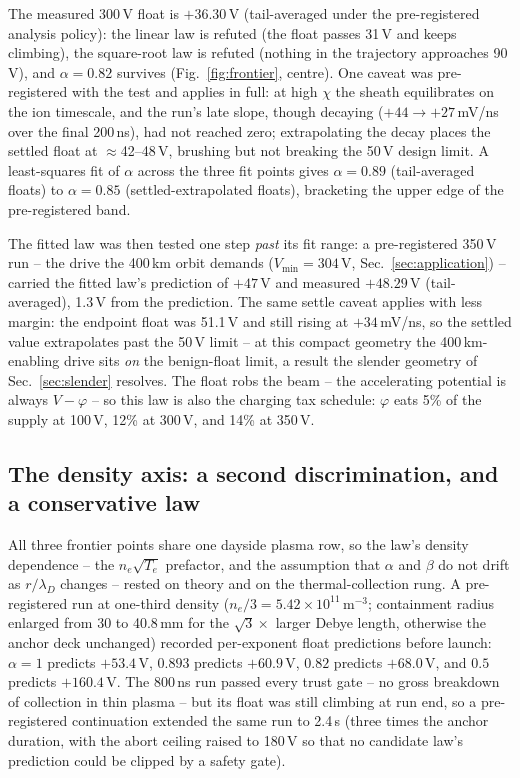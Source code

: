 \documentclass[11pt]{article}
\begin{document}
The measured 300\,V float is $+36.30$\,V (tail-averaged under the
pre-registered analysis policy): the linear law is refuted (the float
passes 31\,V and keeps climbing), the square-root law is refuted (nothing
in the trajectory approaches 90\,V), and $\alpha = 0.82$ survives
(Fig.~\ref{fig:frontier}, centre). One caveat was pre-registered with the
test and applies in full: at high $\chi$ the sheath equilibrates on the ion
timescale, and the run's late slope, though decaying ($+44 \to +27$\,mV/ns
over the final 200\,ns), had not reached zero; extrapolating the decay
places the settled float at $\approx$42--48\,V, brushing but not breaking
the 50\,V design limit. A least-squares fit of $\alpha$ across the three
fit points gives $\alpha = 0.89$ (tail-averaged floats) to
$\alpha = 0.85$ (settled-extrapolated floats), bracketing the upper edge of
the pre-registered band.

The fitted law was then tested one step \emph{past} its fit range: a
pre-registered 350\,V run -- the drive the 400\,km orbit demands
($V_{\min} = 304$\,V, Sec.~\ref{sec:application}) -- carried the fitted
law's prediction of $+47$\,V and measured $+48.29$\,V (tail-averaged),
1.3\,V from the prediction. The same settle caveat applies with less
margin: the endpoint float was 51.1\,V and still rising at $+34$\,mV/ns,
so the settled value extrapolates past the 50\,V limit -- at this compact
geometry the 400\,km-enabling drive sits \emph{on} the benign-float limit,
a result the slender geometry of Sec.~\ref{sec:slender} resolves. The
float robs the beam -- the accelerating
potential is always $V - \varphi$ -- so this law is also the charging tax
schedule: $\varphi$ eats 5\% of the supply at 100\,V, 12\% at 300\,V, and
14\% at 350\,V.

\subsection{The density axis: a second discrimination, and a conservative
law}
\label{sec:density}
All three frontier points share one dayside plasma row, so the law's
density dependence -- the $n_e\sqrt{T_e}$ prefactor, and the assumption
that $\alpha$ and $\beta$ do not drift as $r/\lambda_D$ changes -- rested
on theory and on the thermal-collection rung. A pre-registered run at
one-third density ($n_e/3 = 5.42\times10^{11}$\,m$^{-3}$; containment
radius enlarged from 30 to 40.8\,mm for the $\sqrt{3}\times$ larger Debye
length, otherwise the anchor deck unchanged) recorded per-exponent float
predictions before launch: $\alpha = 1$ predicts $+53.4$\,V, $0.893$
predicts $+60.9$\,V, $0.82$ predicts $+68.0$\,V, and $0.5$ predicts
$+160.4$\,V. The 800\,ns run passed every trust gate -- no gross
breakdown of collection in thin plasma -- but its float was still
climbing at run end, so a pre-registered continuation extended the same
run to 2.4\,\textmu s (three times the anchor duration, with the abort
ceiling raised to 180\,V so that no candidate law's prediction could be
clipped by a safety gate).
\end{document}
